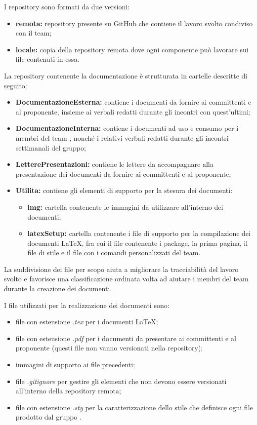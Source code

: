 I repository sono formati da due versioni:
\begin{itemize}
	\item \textbf{remota:} repository presente su GitHub che contiene il lavoro svolto condiviso con il team;
	\item \textbf{locale:} copia della repository remota dove ogni componente può lavorare sui file contenuti in essa.
\end{itemize}

La repository contenente la documentazione è strutturata in cartelle descritte di seguito:
\begin{itemize}
 \item \textbf{DocumentazioneEsterna:} contiene i documenti da fornire ai committenti e al proponente, insieme ai verbali redatti durante gli incontri con quest'ultimi;
\item \textbf{DocumentazioneInterna:} contiene i documenti ad uso e consumo per i membri del team \Omicron, nonché i relativi verbali redatti durante gli incontri settimanali del gruppo;
\item \textbf{LetterePresentazioni:} contiene le lettere da accompagnare alla presentazione dei documenti da fornire ai committenti e al proponente;
\item \textbf{Utilita:} contiene gli elementi di supporto per la stesura dei documenti:
\begin{itemize}
	\item \textbf{img:} cartella contenente le immagini da utilizzare all'interno dei documenti;
	\item \textbf{latexSetup: } cartella contenente i file di supporto per la compilazione dei documenti \LaTeX, fra cui il file contenente i package, la prima pagina, il file di stile e il file con i comandi personalizzati del team.
\end{itemize}
\end{itemize}
La suddivisione dei file per scopo aiuta a migliorare la tracciabilità del lavoro svolto e favorisce una classificazione ordinata volta ad aiutare i membri del team durante la creazione dei documenti.


I file utilizzati per la realizzazione dei documenti sono:
\begin{itemize}
	\item file con estensione \textit{.tex} per i documenti \LaTeX;
	\item file con estensione \textit{.pdf} per i documenti da presentare ai committenti e al proponente (questi file non vanno versionati nella repository);
	\item immagini di supporto ai file precedenti;
	\item file \textit{.gitignore} per gestire gli elementi che non devono essere versionati all'interno della repository remota;
	\item file con estensione \textit{.sty} per la caratterizzazione dello stile che definisce ogni file prodotto dal gruppo \Omicron.
\end{itemize}

